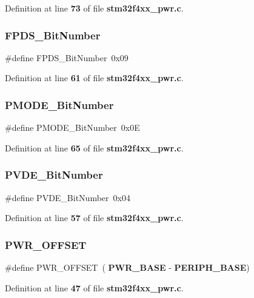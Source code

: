 Definition at line \textbf{ 73} of file \textbf{ stm32f4xx\+\_\+pwr.\+c}.

\mbox{\label{group__PWR_gad99a3da921e3e64587f6b9505ecba665}} 
\subsubsection{F\+P\+D\+S\+\_\+\+Bit\+Number}
{\footnotesize\ttfamily \#define F\+P\+D\+S\+\_\+\+Bit\+Number~0x09}



Definition at line \textbf{ 61} of file \textbf{ stm32f4xx\+\_\+pwr.\+c}.

\mbox{\label{group__PWR_ga15fea9df1b0d324394336f70b319b377}} 
\subsubsection{P\+M\+O\+D\+E\+\_\+\+Bit\+Number}
{\footnotesize\ttfamily \#define P\+M\+O\+D\+E\+\_\+\+Bit\+Number~0x0E}



Definition at line \textbf{ 65} of file \textbf{ stm32f4xx\+\_\+pwr.\+c}.

\mbox{\label{group__PWR_ga17d618eb800c401ef9c6789c9374eaf8}} 
\subsubsection{P\+V\+D\+E\+\_\+\+Bit\+Number}
{\footnotesize\ttfamily \#define P\+V\+D\+E\+\_\+\+Bit\+Number~0x04}



Definition at line \textbf{ 57} of file \textbf{ stm32f4xx\+\_\+pwr.\+c}.

\mbox{\label{group__PWR_ga7f88bce73931300319824f22578f90de}} 
\subsubsection{P\+W\+R\+\_\+\+O\+F\+F\+S\+ET}
{\footnotesize\ttfamily \#define P\+W\+R\+\_\+\+O\+F\+F\+S\+ET~(\textbf{ P\+W\+R\+\_\+\+B\+A\+SE} -\/ \textbf{ P\+E\+R\+I\+P\+H\+\_\+\+B\+A\+SE})}



Definition at line \textbf{ 47} of file \textbf{ stm32f4xx\+\_\+pwr.\+c}.

